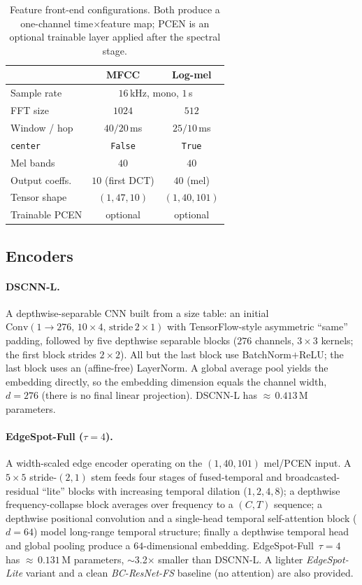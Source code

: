 \documentclass[10pt,twocolumn]{article}
\newcommand{\code}[1]{\texttt{\small #1}}
\begin{document}
\begin{table}[t]
\centering
\caption{Feature front-end configurations. Both produce a one-channel
time$\times$feature map; PCEN is an optional trainable layer applied after the
spectral stage.}
\label{tab:features}
\small
\begin{tabular}{lcc}
\toprule
 & \textbf{MFCC} & \textbf{Log-mel} \\
\midrule
Sample rate            & \multicolumn{2}{c}{$16$\,kHz, mono, $1$\,s} \\
FFT size               & $1024$  & $512$  \\
Window / hop           & $40/20$\,ms & $25/10$\,ms \\
\code{center}          & \code{False} & \code{True} \\
Mel bands              & $40$ & $40$ \\
Output coeffs.         & $10$ (first DCT) & $40$ (mel) \\
Tensor shape           & $(1,47,10)$ & $(1,40,101)$ \\
Trainable PCEN         & optional & optional \\
\bottomrule
\end{tabular}
\end{table}

\subsection{Encoders}\label{sec:encoders}

\paragraph{DSCNN-L.}
A depthwise-separable CNN built from a size table: an initial
$\text{Conv}(1{\to}276,\,10{\times}4,\,\text{stride}\,2{\times}1)$ with
TensorFlow-style asymmetric ``same'' padding, followed by five depthwise
separable blocks ($276$ channels, $3{\times}3$ kernels; the first block strides
$2{\times}2$). All but the last block use BatchNorm$+$ReLU; the last block uses
an (affine-free) LayerNorm. A global average pool yields the embedding directly,
so the embedding dimension equals the channel width, $d=276$ (there is no final
linear projection). DSCNN-L has $\approx$\,$0.413$\,M parameters.

\paragraph{EdgeSpot-Full ($\tau{=}4$).}
A width-scaled edge encoder operating on the $(1,40,101)$ mel/PCEN input.
A $5{\times}5$ stride-$(2,1)$ stem feeds four stages of fused-temporal and
broadcasted-residual ``lite'' blocks with increasing temporal dilation
($1,2,4,8$); a depthwise frequency-collapse block averages over frequency to a
$(C,T)$ sequence; a depthwise positional convolution and a single-head temporal
self-attention block ($d=64$) model long-range temporal structure; finally a
depthwise temporal head and global pooling produce a $64$-dimensional embedding.
EdgeSpot-Full~$\tau{=}4$ has $\approx$\,$0.131$\,M parameters, $\sim$3.2$\times$
smaller than DSCNN-L. A lighter \emph{EdgeSpot-Lite} variant and a clean
\emph{BC-ResNet-FS} baseline (no attention) are also provided.
\end{document}

